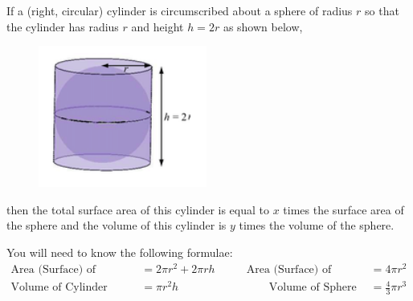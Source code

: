 \documentclass[10pt]{article}
\newenvironment{question}[2][Question]{\begin{trivlist}
\item[\hskip \labelsep {\bfseries #1}\hskip \labelsep {\bfseries #2.}]}{\end{trivlist}}
\begin{document}
\newpage

\begin{question}{3}
	If a (right, circular) cylinder is circumscribed about a sphere of radius $r$ so that the cylinder has radius $r$ and height $h = 2r$ as shown below,

	\begin{figure}[h!]
		\includegraphics[width=.21\linewidth]{assets/cylinder.png}
		\centering
	\end{figure}
	\noindent
	then the total surface area of this cylinder is equal to $x$ times the surface area of the sphere and the volume of this cylinder is $y$ times the volume of the sphere.

	You will need to know the following formulae:
	\begin{align*}
		\text{Area (Surface) of Cylinder} & =  2 \pi r^2 + 2\pi rh \qquad & \text{Area (Surface) of Sphere} & =  4 \pi r^2         \\
		\text{Volume of Cylinder}         & =  \pi r^2 h                  & \qquad \text{Volume of Sphere}  & =  \frac 4 3 \pi r^3
	\end{align*}


\end{question}
\end{document}
